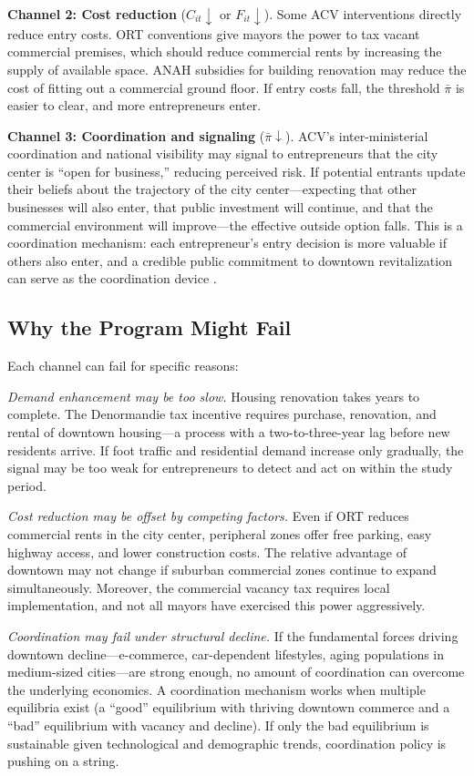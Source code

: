 \documentclass[12pt]{article}
\begin{document}
\textbf{Channel 2: Cost reduction} ($C_{it} \downarrow$ or $F_{it} \downarrow$). Some ACV interventions directly reduce entry costs. ORT conventions give mayors the power to tax vacant commercial premises, which should reduce commercial rents by increasing the supply of available space. ANAH subsidies for building renovation may reduce the cost of fitting out a commercial ground floor. If entry costs fall, the threshold $\bar{\pi}$ is easier to clear, and more entrepreneurs enter.

\textbf{Channel 3: Coordination and signaling} ($\bar{\pi} \downarrow$). ACV's inter-ministerial coordination and national visibility may signal to entrepreneurs that the city center is ``open for business,'' reducing perceived risk. If potential entrants update their beliefs about the trajectory of the city center---expecting that other businesses will also enter, that public investment will continue, and that the commercial environment will improve---the effective outside option falls. This is a coordination mechanism: each entrepreneur's entry decision is more valuable if others also enter, and a credible public commitment to downtown revitalization can serve as the coordination device \citep{kline2013place}.

\subsection{Why the Program Might Fail}

Each channel can fail for specific reasons:

\textit{Demand enhancement may be too slow.} Housing renovation takes years to complete. The Denormandie tax incentive requires purchase, renovation, and rental of downtown housing---a process with a two-to-three-year lag before new residents arrive. If foot traffic and residential demand increase only gradually, the signal may be too weak for entrepreneurs to detect and act on within the study period.

\textit{Cost reduction may be offset by competing factors.} Even if ORT reduces commercial rents in the city center, peripheral zones offer free parking, easy highway access, and lower construction costs. The relative advantage of downtown may not change if suburban commercial zones continue to expand simultaneously. Moreover, the commercial vacancy tax requires local implementation, and not all mayors have exercised this power aggressively.

\textit{Coordination may fail under structural decline.} If the fundamental forces driving downtown decline---e-commerce, car-dependent lifestyles, aging populations in medium-sized cities---are strong enough, no amount of coordination can overcome the underlying economics. A coordination mechanism works when multiple equilibria exist (a ``good'' equilibrium with thriving downtown commerce and a ``bad'' equilibrium with vacancy and decline). If only the bad equilibrium is sustainable given technological and demographic trends, coordination policy is pushing on a string.
\end{document}
